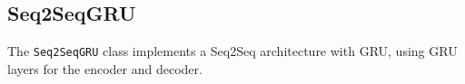 \subsection{Seq2SeqGRU}
The \texttt{Seq2SeqGRU} class implements a Seq2Seq architecture with GRU, using GRU layers for the encoder and decoder.

